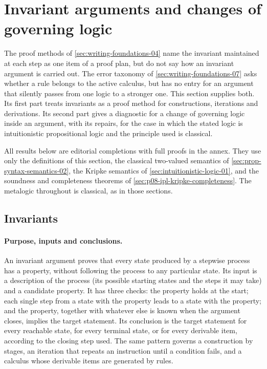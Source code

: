 \section{Invariant arguments and changes of governing logic}
\label{sec:p01-w02-p01-023-invariants-logic}

The proof methods of \cref{sec:writing-foundations-04} name the invariant
maintained at each step as one item of a proof plan, but do not say how an
invariant argument is carried out. The error taxonomy of
\cref{sec:writing-foundations-07} asks whether a rule belongs to the active
calculus, but has no entry for an argument that silently passes from one
logic to a stronger one. This section supplies both. Its first part treats
invariants as a proof method for constructions, iterations and derivations.
Its second part gives a diagnostic for a change of governing logic inside an
argument, with its repairs, for the case in which the stated logic is
intuitionistic propositional logic and the principle used is classical.

All results below are editorial completions with full proofs in the annex.
They use only the definitions of this section, the classical two-valued
semantics of \cref{sec:prop-syntax-semantics-02}, the Kripke semantics of
\cref{sec:intuitionistic-logic-01}, and the soundness and completeness
theorems of \cref{sec:p08-ipl-kripke-completeness}. The metalogic throughout
is classical, as in those sections.

\subsection{Invariants}
\label{sec:p01-w02-p01-023-invariants}

\paragraph{Purpose, inputs and conclusions.}
An invariant argument proves that every state produced by a stepwise process
has a property, without following the process to any particular state. Its
input is a description of the process (its possible starting states and the
steps it may take) and a candidate property. It has three checks:
the property holds at the start; each single step from a state with the
property leads to a state with the property; and the property, together with
whatever else is known when the argument closes, implies the target
statement. Its conclusion is the target statement for every reachable state,
for every terminal state, or for every derivable item, according to the
closing step used. The same pattern governs a construction by stages, an
iteration that repeats an instruction until a condition fails, and a
calculus whose derivable items are generated by rules.

